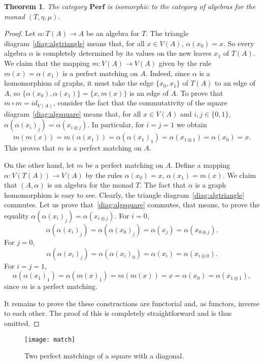 \documentclass[reqno,A4paper]{amsart}
\newcommand{\Perf}{\mathbf{Perf}}
\newtheorem{theorem}{Theorem}[section]
\theoremstyle{definition}
\numberwithin{equation}{section}
\begin{document}
\begin{theorem}
The category $\Perf$ is isomorphic to the category of algebras for the monad $(T,\eta,\mu)$.
\label{thm:MatchingsAreAlgebras}
\end{theorem}
\begin{proof}
Let $\alpha:T(A)\to A$ be an algebra for $T$. The triangle diagram~\eqref{diag:algtriangle}
means that, for all $x\in V(A)$, $\alpha(x_0)=x$. So every algebra 
$\alpha$ is completely determined by its values on the new leaves $x_1$ of
$T(A)$. We claim that the mapping $m:V(A)\to V(A)$ given by the
rule $m(x)=\alpha(x_1)$ is a perfect matching on $A$. Indeed, since
$\alpha$ is a homomorphism of graphs, it must take the edge $\{x_0,x_1\}$ of $T(A)$
to an edge of $A$, so $\{\alpha(x_0),\alpha(x_1)\}=\{x,m(x)\}$ is an edge of $A$.
To prove that $m\circ m=id_{V(A)}$, consider the fact that the commutativity of the square diagram~\eqref{diag:algsquare}
means that, for all $x\in V(A)$ and $i,j\in\{0,1\}$,
$\alpha(\alpha(x_i)_j)=\alpha(x_{i\oplus j})$. In
particular, for $i=j=1$ we obtain
$$
m(m(x))=m(\alpha(x_1))=\alpha(\alpha(x_1)_1)=\alpha(x_{1\oplus 1})=\alpha(x_0)=x.
$$
This proves that $m$ is a perfect matching on $A$.

On the other hand, let $m$ be a perfect matching on $A$. Define a mapping 
$\alpha:V(T(A))\to V(A)$ by the rules $\alpha(x_0)=x$, $\alpha(x_1)=m(x)$.
We claim that $(A,\alpha)$ is an algebra for the monad $T$.
The fact that $\alpha$ is a graph homomorphism is easy to see. Clearly,
the triangle diagram~\eqref{diag:algtriangle} commutes.
Let us prove that~\eqref{diag:algsquare} commutes, that means, to prove the equality
$\alpha(\alpha(x_i)_j)=\alpha(x_{i\oplus j})$. For $i=0$,
$$
\alpha(\alpha(x_i)_j)=\alpha(\alpha(x_0)_j)=\alpha(x_j)=\alpha(x_{0\oplus j}).
$$
For $j=0$,
$$
\alpha(\alpha(x_i)_j)=\alpha(\alpha(x_i)_0)=\alpha(x_i)=\alpha(x_{i\oplus 0}).
$$
For $i=j=1$,
$$
\alpha(\alpha(x_1)_1)=\alpha(m(x)_1)=m(m(x))=x=\alpha(x_0)=\alpha(x_{1\oplus 1}),
$$
since $m$ is a perfect matching.

It remains to prove the these constructions are functorial and, as functors,
inverse to each other. The proof of this is completely straightforward and is
thus omitted.
\end{proof}
\begin{figure}
\begin{center}
\texttt{[image: match]}
\end{center}
\caption{Two perfect matchings of a square with a diagonal.}
\label{fig:match}
\end{figure}
\end{document}
